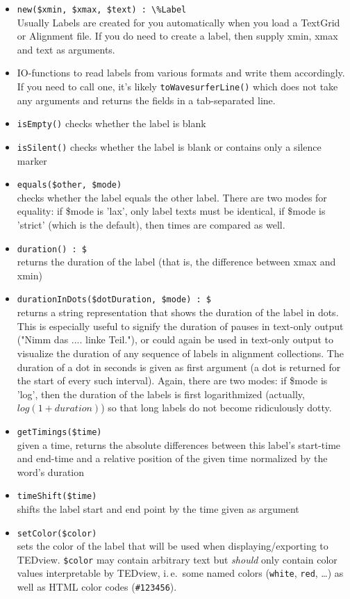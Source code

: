 \documentclass[a4,twoside=off,draft=true]{scrartcl}
\begin{document}
\begin{itemize}
\item {\tt new(\$xmin, \$xmax, \$text) :\ \textbackslash{\%Label}} \\
 Usually Labels are created for you automatically when you load a TextGrid or Alignment file. 
 If you do need to create a label, then supply xmin, xmax and text as arguments.
\item IO-functions to read labels from various formats and write them accordingly. 
 If you need to call one, it's likely {\tt toWavesurferLine()} which does not 
 take any arguments and returns the fields in a tab-separated line.
\item {\tt isEmpty()} checks whether the label is blank
\item {\tt isSilent()} checks whether the label is blank or contains only a silence marker
\item {\tt equals(\$other, {\$mode})} \\
 checks whether the label equals the other label. There are two modes
 for equality: if \$mode is 'lax', only label texts must be identical, 
 if \$mode is 'strict' (which is the default), then times are compared as well.
\item {\tt duration() :\ \$} \\
 returns the duration of the label (that is, the difference between xmax and xmin)
\item {\tt durationInDots(\$dotDuration, \$mode) :\ \$} \\
 returns a string representation that shows the duration of the label in dots. 
 This is especially useful to signify the duration of pauses in text-only 
 output ("Nimm das .... linke Teil."), or could again be used in text-only output 
 to visualize the duration of any sequence of labels in alignment collections. 
 The duration of a dot in seconds is given as first argument (a dot is returned for 
 the start of every such interval). Again, there are two modes: if \$mode is 'log', 
 then the duration of the labels is first logarithmized (actually,
 $log(1 + duration)$) so that long labels do not become ridiculously dotty.
\item {\tt getTimings(\$time)} \\
 given a time, returns the absolute differences between this label's start-time and end-time 
 and a relative position of the given time normalized by the word's duration
\item {\tt timeShift(\$time)} \\
 shifts the label start and end point by the time given as argument
\item {\tt setColor(\$color)} \\ 
 sets the color of the label that will be used when displaying/exporting to TEDview.
 {\tt \$color} may contain arbitrary text but \emph{should} only contain color values
 interpretable by TEDview, i.\,e.\ some named colors ({\tt white}, {\tt red}, \ldots) as
 well as HTML color codes ({\tt \#123456}).
\end{itemize}
\end{document}
